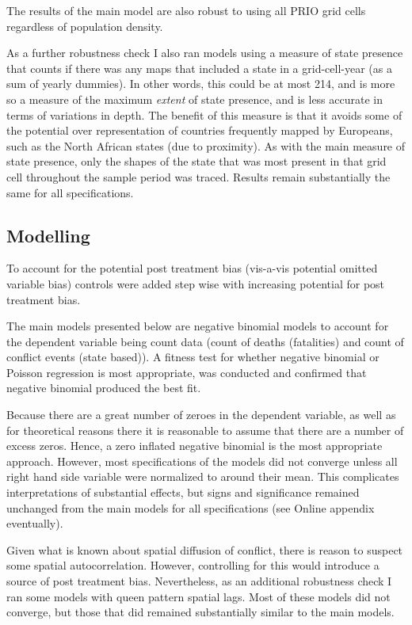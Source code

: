 \documentclass[12pt]{article}
\begin{document}
The results of the main model are also robust to using all PRIO grid cells
regardless of population density.

As a further robustness check I also ran models using a measure of state
presence that counts if there was any maps that included a state in a
grid-cell-year (as a sum of yearly dummies). In other words, this could be at
most 214, and is more so a measure of the maximum \textit{extent} of state
presence, and is less accurate in terms of variations in depth. The benefit of
this measure is that it avoids some of the potential over representation of
countries frequently mapped by Europeans, such as the North African states (due
to proximity). As with the main measure of state presence, only the shapes of
the state that was most present in that grid cell throughout the sample period
was traced. Results remain substantially the same for all specifications.

\subsection{Modelling}

To account for the potential post treatment bias (vis-a-vis potential omitted
variable bias) controls were added step wise with increasing potential for post
treatment bias.

The main models presented below are negative binomial models to account for the
dependent variable being count data (count of deaths (fatalities) and count of
conflict events (state based)). A fitness test for whether negative binomial or
Poisson regression is most appropriate, was conducted and confirmed that
negative binomial produced the best fit.

Because there are a great number of zeroes in the dependent variable, as well
as for theoretical reasons there it is reasonable to assume that there are a
number of excess zeros. Hence, a zero inflated negative binomial is the most
appropriate approach. However, most specifications of the models did not
converge unless all right hand side variable were normalized to around their
mean. This complicates interpretations of substantial effects, but signs and
significance remained unchanged from the main models for all specifications (see
Online appendix eventually).

Given what is known about spatial diffusion of conflict, there is reason to
suspect some spatial autocorrelation. However, controlling for this would
introduce a source of post treatment bias. Nevertheless, as an additional
robustness check I ran some models with queen pattern spatial lags. Most of
these models did not converge, but those that did remained substantially similar
to the main models.
\end{document}
